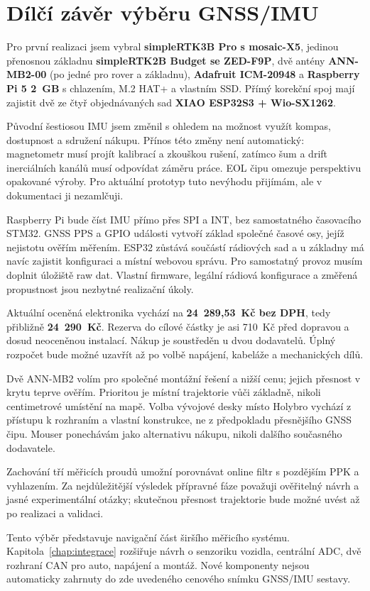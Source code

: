 \section{Dílčí závěr výběru GNSS/IMU}

Pro první realizaci jsem vybral \textbf{simpleRTK3B Pro s mosaic-X5},
jedinou přenosnou základnu \textbf{simpleRTK2B Budget se ZED-F9P},
dvě antény \textbf{ANN-MB2-00} (po jedné pro rover a základnu),
\textbf{Adafruit ICM-20948} a \textbf{Raspberry Pi 5 2~GB} s chlazením,
M.2 HAT+ a vlastním SSD. Přímý korekční spoj mají zajistit dvě ze čtyř
objednávaných sad \textbf{XIAO ESP32S3 + Wio-SX1262}.

Původní šestiosou IMU jsem změnil s ohledem na možnost využít kompas,
dostupnost a sdružení nákupu. Přínos této změny není automatický:
magnetometr musí projít kalibrací a zkouškou rušení, zatímco šum a drift
inerciálních kanálů musí odpovídat záměru práce. EOL čipu omezuje
perspektivu opakované výroby. Pro aktuální prototyp tuto nevýhodu přijímám,
ale v dokumentaci ji nezamlčuji.

Raspberry Pi bude číst IMU přímo přes SPI a INT, bez samostatného
časovacího STM32. GNSS PPS a GPIO události vytvoří základ společné
časové osy, jejíž nejistotu ověřím měřením. ESP32 zůstává součástí rádiových
sad a u základny má navíc zajistit konfiguraci a místní webovou správu.
Pro samostatný provoz musím doplnit úložiště raw dat. Vlastní firmware, legální rádiová konfigurace
a změřená propustnost jsou nezbytné realizační úkoly.

Aktuální oceněná elektronika vychází na \textbf{24~289,53~Kč bez DPH},
tedy přibližně \textbf{24~290~Kč}. Rezerva do cílové částky je asi
710~Kč před dopravou a dosud neoceněnou instalací. Nákup je soustředěn
u dvou dodavatelů. Úplný rozpočet bude možné uzavřít až po volbě napájení,
kabeláže a mechanických dílů.

Dvě ANN-MB2 volím pro společné montážní řešení a nižší cenu; jejich
přesnost v krytu teprve ověřím. Prioritou je místní trajektorie vůči
základně, nikoli centimetrové umístění na mapě. Volba vývojové desky
místo Holybro vychází z přístupu k rozhraním a vlastní konstrukce,
ne z předpokladu přesnějšího GNSS čipu. Mouser ponechávám jako
alternativu nákupu, nikoli dalšího současného dodavatele.

Zachování tří měřicích proudů umožní porovnávat online filtr s pozdějším
PPK a vyhlazením. Za nejdůležitější výsledek přípravné fáze považuji
ověřitelný návrh a jasné experimentální otázky; skutečnou přesnost
trajektorie bude možné uvést až po realizaci a validaci.

Tento výběr představuje navigační část širšího měřicího systému.
Kapitola~\ref{chap:integrace} rozšiřuje návrh o senzoriku vozidla,
centrální ADC, dvě rozhraní CAN pro auto, napájení a montáž. Nové komponenty nejsou
automaticky zahrnuty do zde uvedeného cenového snímku GNSS/IMU sestavy.
